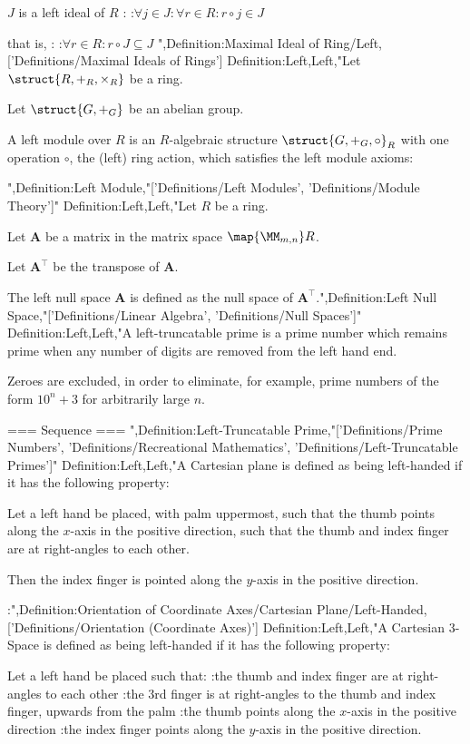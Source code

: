 $J$ is a left ideal of $R$ :
:$\forall j \in J: \forall r \in R: r \circ j \in J$

that is, :
:$\forall r \in R: r \circ J \subseteq J$
",Definition:Maximal Ideal of Ring/Left,['Definitions/Maximal Ideals of Rings']
Definition:Left,Left,"Let $\struct {R, +_R, \times_R}$ be a ring.

Let $\struct {G, +_G}$ be an abelian group.


A left module over $R$ is an $R$-algebraic structure $\struct {G, +_G, \circ}_R$ with one operation $\circ$, the (left) ring action, which satisfies the left module axioms:

",Definition:Left Module,"['Definitions/Left Modules', 'Definitions/Module Theory']"
Definition:Left,Left,"Let $R$ be a ring.

Let $\mathbf A$ be a matrix in the matrix space $\map {\MM_{m, n} } R$.

Let $\mathbf A^\intercal$ be the transpose of $\mathbf A$.

The left null space $\mathbf A$ is defined as the null space of $\mathbf A^\intercal$.",Definition:Left Null Space,"['Definitions/Linear Algebra', 'Definitions/Null Spaces']"
Definition:Left,Left,"A left-truncatable prime is a prime number which remains prime when any number of digits are removed from the left hand end.

Zeroes are excluded, in order to eliminate, for example, prime numbers of the form $10^n + 3$ for arbitrarily large $n$.


=== Sequence ===
",Definition:Left-Truncatable Prime,"['Definitions/Prime Numbers', 'Definitions/Recreational Mathematics', 'Definitions/Left-Truncatable Primes']"
Definition:Left,Left,"A Cartesian plane is defined as being left-handed if it has the following property:

Let a left hand be placed, with palm uppermost, such that the thumb points along the $x$-axis in the positive direction, such that the thumb and index finger are at right-angles to each other.

Then the index finger is pointed along the $y$-axis in the positive direction.


:",Definition:Orientation of Coordinate Axes/Cartesian Plane/Left-Handed,['Definitions/Orientation (Coordinate Axes)']
Definition:Left,Left,"A Cartesian $3$-Space is defined as being left-handed if it has the following property:

Let a left hand be placed such that:
:the thumb and index finger are at right-angles to each other
:the $3$rd finger is at right-angles to the thumb and index finger, upwards from the palm
:the thumb points along the $x$-axis in the positive direction
:the index finger points along the $y$-axis in the positive direction.

